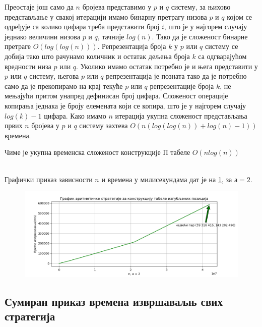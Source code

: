 \documentclass[a4paper]{article}
\begin{document}
Преостаје још само да $ n $ бројева представимо у $ p $ и $ q $ систему, за њихово представљање у свакој итерацији имамо бинарну претрагу низова $ p $ и $ q $ којом се одређује са колико цифара треба представити број $ i $, што је у најгорем случају једнако величини низова $ p $ и $ q $, тачније $ log(n) $. Тако да је сложеност бинарне претраге $ O(log(log(n))) $. Репрезентација броја $ k $ у $ p $ или $ q $ систему се добија тако што рачунамо количник и остатак дељења броја $ k $ са одгварајућом вредности низа $ p $ или $ q $. Уколико имамо остатак потребно је и њега представити у $ p $ или $ q $ систему, његова $ p $ или $ q $ репрезентација је позната тако да је потребно само да је прекопирамо на крај текуће $ p $ или $ q $ репрезентације броја $ k $, не мењајући притом унапред дефинисан број цифара. Сложеност операције копирања једнака је броју елемената који се копира, што је у најгорем случају $ log(k) - 1 $ цифара. Како имамо $ n $ итерација укупна сложеност представљања првих $ n $ бројева у $ p $ и $ q $ систему захтева $ O(n(log(log(n)) + log(n) - 1)) $ времена.

Чиме је укупна временска сложеност конструкције П табеле $ O(nlog(n)) $



\leavevmode\\
Графички приказ зависности $ n $ и времена у милисекундама дат је на \ref{fig:arithmetic}, за $ а = 2 $.

\begin{figure}[H]
	\label{fig:arithmetic}
	\centering
	\includegraphics[width=\textwidth]{arithmetic.png}
\end{figure} 

\subsection{Сумиран приказ времена извршаваљњ свих стратегија}
\end{document}
